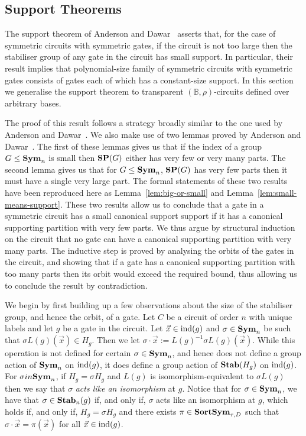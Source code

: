 \documentclass[../paper.tex]{subfiles}
\begin{document}
\subsection{Support Theorems}
The support theorem of Anderson and Dawar~\cite{AndersonD17} asserts that, for
the case of symmetric circuits with symmetric gates, if the circuit is not too
large then the stabiliser group of any gate in the circuit has small support. In
particular, their result implies that polynomial-size family of symmetric
circuits with symmetric gates consists of gates each of which has a
constant-size support. In this section we generalise the support theorem to
transparent $(\mathbb{B}, \rho)$-circuits defined over arbitrary bases.

The proof of this result follows a strategy broadly similar to the one used by
Anderson and Dawar~\cite{AndersonD17}. We also make use of two lemmas proved by
Anderson and Dawar~\cite{AndersonD17}. The first of these lemmas gives us that
if the index of a group $G \leq \text{\textbf{Sym}}_n$ is small then $\text{\textbf{SP}}(G)$ either has very
few or very many parts. The second lemma gives us that for $G \leq \text{\textbf{Sym}}_n$,
$\text{\textbf{SP}}(G)$ has very few parts then it must have a single very large part. The
formal statements of these two results have been reproduced here as
Lemma~\ref{lem:big-or-small} and Lemma~\ref{lem:small-means-support}. These two
results allow us to conclude that a gate in a symmetric circuit has a small
canonical support support if it has a canonical supporting partition with very
few parts. We thus argue by structural induction on the circuit that no gate can
have a canonical supporting partition with very many parts. The inductive step
is proved by analysing the orbits of the gates in the circuit, and showing that
if a gate has a canonical supporting partition with too many parts then its
orbit would exceed the required bound, thus allowing us to conclude the result
by contradiction.

We begin by first building up a few observations about the size of the
stabiliser group, and hence the orbit, of a gate. Let $C$ be a circuit of order
$n$ with unique labels and let $g$ be a gate in the circuit. Let $\vec{x} \in
\text{\upshape ind}(g)$ and $\sigma \in \text{\textbf{Sym}}_n$ be such that $\sigma L(g)(\vec{x}) \in H_g$.
Then we let $\sigma \cdot \vec{x} := L(g)^{-1}\sigma L(g)(\vec{x})$. While this
operation is not defined for certain $\sigma \in \text{\textbf{Sym}}_n$, and hence does not
define a group action of $\text{\textbf{Sym}}_n$ on $\text{\upshape ind}(g)$, it does define a group action of
$\text{\textbf{Stab}}(H_g)$ on $\text{\upshape ind}(g)$. For $\sigma in \text{\textbf{Sym}}_n$, if $H_g = \sigma H_g$ and
$L(g)$ is isomorphism-equivalent to $\sigma L(g)$ then we say that $\sigma$
\emph{acts like an isomorphism} at $g$. Notice that for $\sigma \in \text{\textbf{Sym}}_n$, we
have that $\sigma \in \text{\textbf{Stab}}_n(g)$ if, and only if, $\sigma$ acts like an
isomorphism at $g$, which holds if, and only if, $H_g = \sigma H_g$ and there
exists $\pi \in \text{\textbf{SortSym}}_{\tau,D}$ such that $\sigma \cdot \vec{x} = \pi (\vec{x})$
for all $\vec{x} \in \text{\upshape ind}(g)$.
\end{document}
